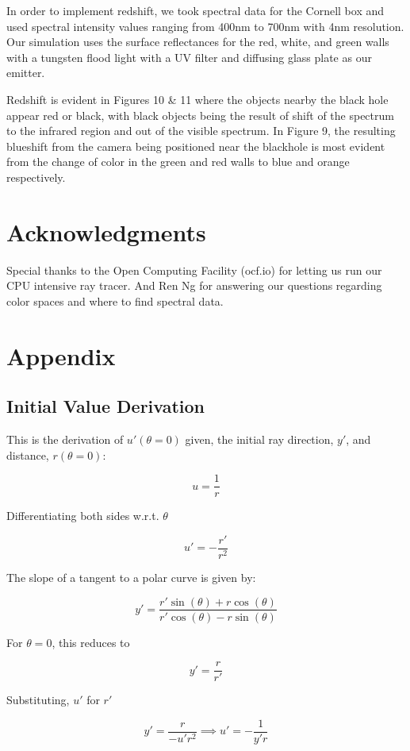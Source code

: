 \documentclass[sigconf]{acmart}
\begin{document}
In order to implement redshift, we took spectral data for the Cornell box and used spectral intensity values ranging from 400nm to 700nm with 4nm resolution\cite{cornell}.  Our simulation uses the surface reflectances for the red, white, and green walls with a tungsten flood light with a UV filter and diffusing glass plate as our emitter.

Redshift is evident in Figures 10 \& 11 where the objects nearby the black hole appear red or black, with black objects being the result of shift of the spectrum to the infrared region and out of the visible spectrum.  In Figure 9, the resulting blueshift from the camera being positioned near the blackhole is most evident from the change of color in the green and red walls to blue and orange respectively.

\section{Acknowledgments}

Special thanks to the Open Computing Facility (ocf.io) for letting us run our CPU intensive ray tracer. And Ren Ng for answering our questions regarding color spaces and where to find spectral data.




\appendix

\section{Appendix}

\subsection{Initial Value Derivation}

This is the derivation of $u'(\theta = 0)$ given, the initial ray direction, $y'$, and distance, $r(\theta = 0)$:

\begin{displaymath}
  u = \frac{1}{r}
\end{displaymath}

Differentiating both sides w.r.t. $\theta$

\begin{displaymath}
  u' = -\frac{r'}{r^2}
\end{displaymath}

The slope of a tangent to a polar curve is given by\cite{wikipedia_2019_2}:

\begin{displaymath}
  y' = \frac{r'\sin(\theta) + r\cos(\theta)}{r'\cos(\theta) - r\sin(\theta)}
\end{displaymath}

For $\theta = 0$, this reduces to

\begin{displaymath}
  y' = \frac{r}{r'}
\end{displaymath}

Substituting, $u'$ for $r'$

\begin{displaymath}
  y' = \frac{r}{-u'r^2} \implies u' = -\frac{1}{y'r}
\end{displaymath}
\end{document}
